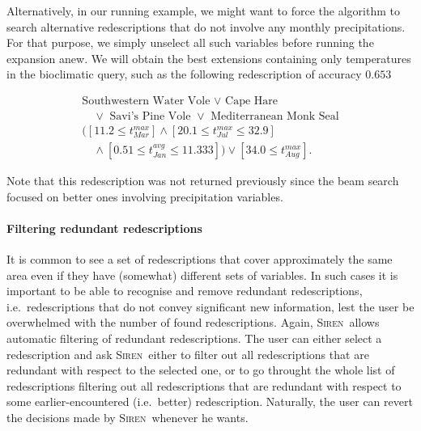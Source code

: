 \documentclass{sig-alternate}
\newcommand{\prg}[1]{\paragraph{#1}}
\newcommand{\Siren}{\textsc{Siren}}
\begin{document}
Alternatively, in our running example, we might want to force
the algorithm to search alternative redescriptions that do not involve
any monthly precipitations. For that purpose, we simply unselect all such
variables before running the expansion anew. We will obtain the best
extensions containing only temperatures in the bioclimatic query, such as the following redescription of accuracy $0.653$

\begin{equation*}
\begin{array}{l}
\text{Southwestern Water Vole }\lor\text{ Cape Hare }\\[1mm]
\quad\lor\text{ Savi's Pine Vole }\lor\text{ Mediterranean Monk Seal}\\[3mm]
( [11.2 \leq t_{Mar}^{max}] \land  [20.1 \leq t_{Jul}^{max} \leq 32.9]\\[1mm] 
\quad\land  [0.51 \leq t_{Jan}^{avg} \leq 11.333]) \lor  [34.0 \leq t_{Aug}^{max}].
\end{array}
\end{equation*}

Note that this redescription was not returned previously since the
beam search focused on better ones involving precipitation variables.




\prg{Filtering redundant redescriptions}
\label{sec:filt-redund-redescr}
It is common to see a set of redescriptions that cover approximately
the same area even if they have (somewhat) different sets of
variables. In such cases it is important to be able to recognise and
remove redundant redescriptions, i.e.\ redescriptions that do not
convey significant new information, lest the user be overwhelmed with
the number of found redescriptions. Again, \Siren\ allows automatic
filtering of redundant redescriptions. The user can either select a
redescription and ask \Siren\ either to filter out all redescriptions
that are redundant with respect to the selected one, or to go throught
the whole list of redescriptions filtering out all redescriptions that
are redundant with respect to some earlier-encountered (i.e.\ better)
redescription. Naturally, the user can revert the decisions made by
\Siren\ whenever he wants.
\end{document}
